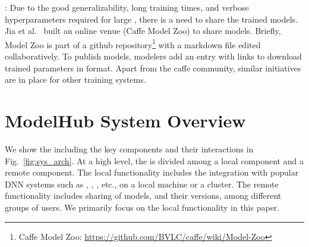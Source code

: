 \documentclass[conference]{IEEEtran}
\begin{document}
: 
Due to the good generalizability, long training times, and verbose hyperparameters required for large \dnn\models, there is a need to share the trained models. 
Jia et al.~\cite{caffe2014mm} built an online venue (Caffe Model Zoo) to share models. Briefly, Model Zoo is part of a github repository\footnote{Caffe Model Zoo: \url{https://github.com/BVLC/caffe/wiki/Model-Zoo}} with a markdown file edited collaboratively. To publish models, modelers add an entry with links to download trained parameters in  format. Apart from the caffe community, similar initiatives are in place for other training systems. 


\section{ModelHub System Overview}
\label{sec:sys_overview}


We show the \modelhub\architecture including the key components and their interactions in
Fig.~\ref{fig:sys_arch}. 
At a high level, the \modelhub\functionality is divided among a local component and a remote component. The local functionality includes the integration with popular DNN systems such as , , , etc., on a local machine or a cluster. The remote functionality includes sharing of models, and their versions, among different groups of users. We primarily focus on the local functionality in this paper.
\end{document}
